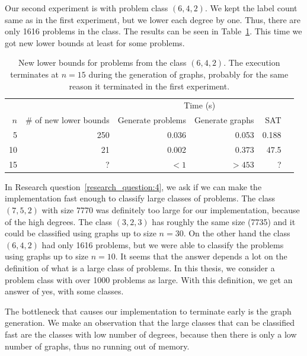 Our second experiment is with problem class $(6,4,2)$.
We kept the label count same as in the first experiment, but we lower each degree by one.
Thus, there are only 1616 problems in the class.
The results can be seen in Table~\ref{tbl:results:new_lower_bounds_for_classes:6_4_2}.
This time we got new lower bounds at least for some problems.
\begin{table}[H]
    \centering
    \begin{tabular}{rrrrrr}
        \toprule
        && \multicolumn{3}{c}{Time (s)} \\
        \cmidrule{3-5}
        $n$ & \# of new lower bounds & Generate problems & Generate graphs & SAT\\
        \midrule
        5  & 250  & 0.036  & 0.053  & 0.188\\
        10 & 21 & 0.002 & 0.373 & 47.5\phantom{00} \\
        15 & ? & $<1$\phantom{.000} & $>453$\phantom{.000} & ? \\
        \bottomrule
    \end{tabular}
    \caption{%
    New lower bounds for problems from the class $(6,4,2)$.
    The execution terminates at $n=15$ during the generation of graphs, probably for the same reason it terminated in the first experiment.
    }
    \label{tbl:results:new_lower_bounds_for_classes:6_4_2}
\end{table}

In Research question~\ref{research_question:4}, we ask if we can make the implementation fast enough to classify large classes of problems.
The class $(7,5,2)$ with size 7770 was definitely too large for our implementation, because of the high degrees.
The class $(3,2,3)$ has roughly the same size (7735) and it could be classified using graphs up to size $n=30$.
On the other hand the class $(6,4,2)$ had only 1616 problems, but we were able to classify the problems using graphs up to size $n=10$.
It seems that the answer depends a lot on the definition of what is a large class of problems.
In this thesis, we consider a problem class with over 1000 problems as large.
With this definition, we get an answer of yes, with some classes.

The bottleneck that causes our implementation to terminate early is the graph generation.
We make an observation that the large classes that can be classified fast are the classes with low number of degrees, because then there is only a low number of graphs, thus no running out of memory.
